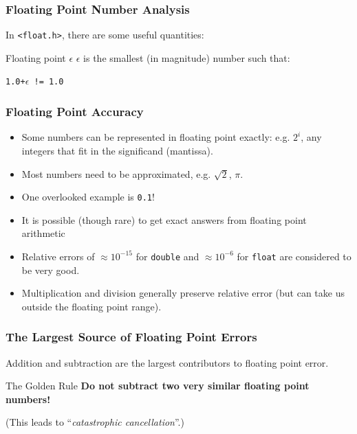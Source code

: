 \documentclass[table]{beamer}
\newif\ifschigh\schighfalse
\newcommand{\kw}[1]{\ifschigh\textcolor{red}{#1}\else\textcolor{keyword}{#1}\fi}
\newcommand{\kt}[1]{\ifschigh\textcolor{red}{#1}\else\textcolor{ctext}{#1}\fi}
\begin{document}
\begin{frame}
\frametitle{Floating Point Number Analysis}
In \kt{\tt <float.h>}, there are some useful quantities:

\begin{block}{Floating point $\epsilon$}
$\epsilon$ is the smallest (in magnitude) number such that:\\
\begin{center}
{\tt 1.0+$\epsilon$ != 1.0}
\end{center}
\end{block}
\end{frame}

\begin{frame}
\frametitle{Floating Point Accuracy}
\begin{itemize}
\item Some numbers can be represented in floating point exactly:
e.g. $2^i$, any integers that fit in the significand (mantissa).
\item Most numbers need to be approximated, e.g. $\sqrt{2}$, $\pi$.
\item One overlooked example is {\tt0.1}!
\item It is possible (though rare) to get exact answers from floating point arithmetic
\item Relative errors of $\approx10^{-15}$ for \kw{\tt double} and
$\approx10^{-6}$ for \kw{\tt float} are considered to be very good.
\item Multiplication and division generally preserve relative error (but can take us outside the floating point range).
\end{itemize}
\end{frame}

{
\begin{frame}
\frametitle{The Largest Source of Floating Point Errors}
Addition and subtraction are the largest contributors to floating point error.

\begin{alertblock}{The Golden Rule}
{\bf Do not subtract two very similar floating point numbers!}
\end{alertblock}

(This leads to ``\emph{catastrophic cancellation}''.)
\end{frame}
}
\end{document}

